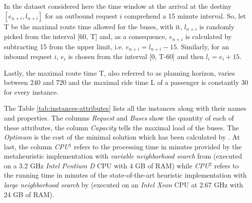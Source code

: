 \documentclass[tuberlin,cic,tc,openright,english,noabntcite,oneside]{iiufrgs}
\begin{document}
In the dataset considered here the time window at the arrival at the destiny $[e_{n+i}, l_{n+i}]$ for an outbound request $i$ comprehend a 15 minute interval. So, let T be the maximal route time allowed for the buses, with it, $l_{n+i}$ is randomly picked from the interval [60, T] and, as a consequence, $e_{n+i}$ is calculated by subtracting 15 from the upper limit, i.e. $e_{n+i} = l_{n+i} - 15$. Similarly, for an inbound request $i$, $e_i$ is chosen from the interval [0, T-60] and then $l_i = e_i + 15$.

Lastly, the maximal route time T, also referred to as planning horizon, varies between 240 and 720 and the maximal ride time L of a passenger is constantly 30 for every instance.

The Table \ref{tab:instances-attributes} lists all the instances along with their names and properties. The columns \emph{Request} and \emph{Buses} show the quantity of each of these attributes, the column \emph{Capacity} tells the maximal load of the buses. The \emph{Optimum} is the cost of the minimal solution which has been calculated by \textcite[p. 270]{ropke_models_2007}. At last, the column \emph{CPU$^1$} refers to the processing time in minutes provided by the metaheuristic implementation with \emph{variable neighborhood search} from \textcite{parragh_introducing_2011} (executed on a 3.2 GHz \emph{Intel Pentium D} CPU with 4 GB of RAM) while \emph{CPU$^2$} refers to the running time in minutes of the state-of-the-art heuristic implementation with \emph{large neighborhood search} by \textcite{parragh_hybrid_2013} (executed on an \emph{Intel Xeon} CPU at 2.67 GHz with 24 GB of RAM).
\end{document}
